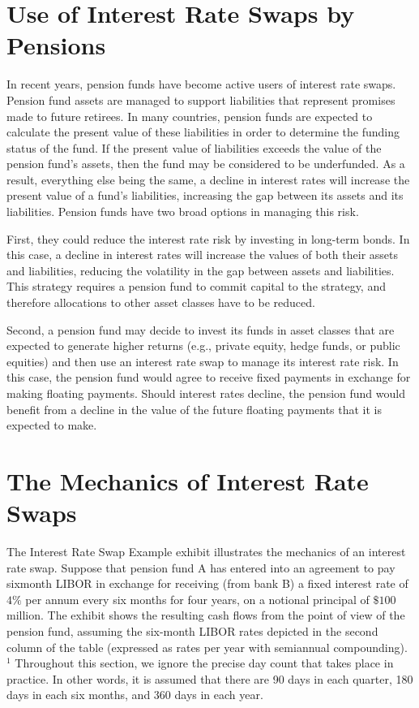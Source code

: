 \documentclass[11pt]{article}
\begin{document}
\section*{Use of Interest Rate Swaps by Pensions}
In recent years, pension funds have become active users of interest rate swaps. Pension fund assets are managed to support liabilities that represent promises made to future retirees. In many countries, pension funds are expected to calculate the present value of these liabilities in order to determine the funding status of the fund. If the present value of liabilities exceeds the value of the pension fund's assets, then the fund may be considered to be underfunded. As a result, everything else being the same, a decline in interest rates will increase the present value of a fund's liabilities, increasing the gap between its assets and its liabilities. Pension funds have two broad options in managing this risk.

First, they could reduce the interest rate risk by investing in long-term bonds. In this case, a decline in interest rates will increase the values of both their assets and liabilities, reducing the volatility in the gap between assets and liabilities. This strategy requires a pension fund to commit capital to the strategy, and therefore allocations to other asset classes have to be reduced.

Second, a pension fund may decide to invest its funds in asset classes that are expected to generate higher returns (e.g., private equity, hedge funds, or public equities) and then use an interest rate swap to manage its interest rate risk. In this case, the pension fund would agree to receive fixed payments in exchange for making floating payments. Should interest rates decline, the pension fund would benefit from a decline in the value of the future floating payments that it is expected to make.

\section*{The Mechanics of Interest Rate Swaps}
The Interest Rate Swap Example exhibit illustrates the mechanics of an interest rate swap. Suppose that pension fund A has entered into an agreement to pay sixmonth LIBOR in exchange for receiving (from bank B) a fixed interest rate of $4 \%$ per annum every six months for four years, on a notional principal of $\$ 100$ million. The exhibit shows the resulting cash flows from the point of view of the pension fund, assuming the six-month LIBOR rates depicted in the second column of the table (expressed as rates per year with semiannual compounding). ${ }^{1}$ Throughout this section, we ignore the precise day count that takes place in practice. In other words, it is assumed that there are 90 days in each quarter, 180 days in each six months, and 360 days in each year.
\end{document}
